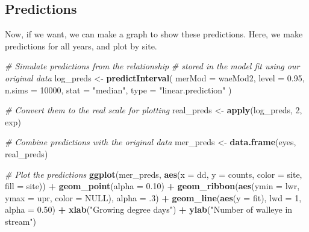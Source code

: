 \documentclass[
]{book}
\newenvironment{Shaded}{\begin{snugshade}}{\end{snugshade}}
\newcommand{\CommentTok}[1]{\textcolor[rgb]{0.56,0.35,0.01}{\textit{#1}}}
\newcommand{\DataTypeTok}[1]{\textcolor[rgb]{0.13,0.29,0.53}{#1}}
\newcommand{\DecValTok}[1]{\textcolor[rgb]{0.00,0.00,0.81}{#1}}
\newcommand{\FloatTok}[1]{\textcolor[rgb]{0.00,0.00,0.81}{#1}}
\newcommand{\KeywordTok}[1]{\textcolor[rgb]{0.13,0.29,0.53}{\textbf{#1}}}
\newcommand{\NormalTok}[1]{#1}
\newcommand{\OperatorTok}[1]{\textcolor[rgb]{0.81,0.36,0.00}{\textbf{#1}}}
\newcommand{\OtherTok}[1]{\textcolor[rgb]{0.56,0.35,0.01}{#1}}
\newcommand{\StringTok}[1]{\textcolor[rgb]{0.31,0.60,0.02}{#1}}
\begin{document}
\hypertarget{glmm-count-preds}{%
\subsection{Predictions}\label{glmm-count-preds}}

Now, if we want, we can make a graph to show these predictions. Here, we make predictions for all years, and plot by site.

\begin{Shaded}
\begin{Highlighting}[]
\CommentTok{# Simulate predictions from the relationship}
\CommentTok{# stored in the model fit using our original data}
\NormalTok{log_preds <-}\StringTok{ }\KeywordTok{predictInterval}\NormalTok{(}
  \DataTypeTok{merMod =}\NormalTok{ waeMod2,}
  \DataTypeTok{level =} \FloatTok{0.95}\NormalTok{, }\DataTypeTok{n.sims =} \DecValTok{10000}\NormalTok{,}
  \DataTypeTok{stat =} \StringTok{"median"}\NormalTok{, }\DataTypeTok{type =} \StringTok{"linear.prediction"}
\NormalTok{)}

\CommentTok{# Convert them to the real scale for plotting}
\NormalTok{real_preds <-}\StringTok{ }\KeywordTok{apply}\NormalTok{(log_preds, }\DecValTok{2}\NormalTok{, exp)}

\CommentTok{# Combine predictions with the original data}
\NormalTok{mer_preds <-}\StringTok{ }\KeywordTok{data.frame}\NormalTok{(eyes, real_preds)}

\CommentTok{# Plot the predictions}
\KeywordTok{ggplot}\NormalTok{(mer_preds, }\KeywordTok{aes}\NormalTok{(}\DataTypeTok{x =}\NormalTok{ dd, }\DataTypeTok{y =}\NormalTok{ counts, }\DataTypeTok{color =}\NormalTok{ site, }\DataTypeTok{fill =}\NormalTok{ site)) }\OperatorTok{+}
\StringTok{  }\KeywordTok{geom_point}\NormalTok{(}\DataTypeTok{alpha =} \FloatTok{0.10}\NormalTok{) }\OperatorTok{+}
\StringTok{  }\KeywordTok{geom_ribbon}\NormalTok{(}\KeywordTok{aes}\NormalTok{(}\DataTypeTok{ymin =}\NormalTok{ lwr, }\DataTypeTok{ymax =}\NormalTok{ upr, }\DataTypeTok{color =} \OtherTok{NULL}\NormalTok{), }\DataTypeTok{alpha =} \FloatTok{.3}\NormalTok{) }\OperatorTok{+}
\StringTok{  }\KeywordTok{geom_line}\NormalTok{(}\KeywordTok{aes}\NormalTok{(}\DataTypeTok{y =}\NormalTok{ fit), }\DataTypeTok{lwd =} \DecValTok{1}\NormalTok{, }\DataTypeTok{alpha =} \FloatTok{0.50}\NormalTok{) }\OperatorTok{+}
\StringTok{  }\KeywordTok{xlab}\NormalTok{(}\StringTok{"Growing degree days"}\NormalTok{) }\OperatorTok{+}
\StringTok{  }\KeywordTok{ylab}\NormalTok{(}\StringTok{"Number of walleye in stream"}\NormalTok{)}
\end{Highlighting}
\end{Shaded}
\end{document}
